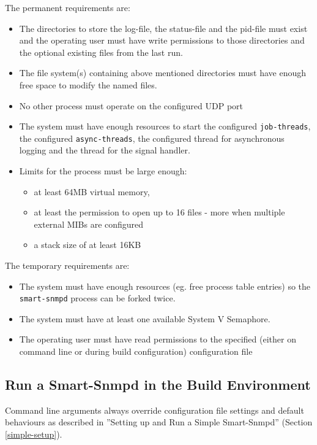 The permanent requirements are:
\begin{itemize}
\item The directories to store the log-file, the status-file and the pid-file
must exist and the operating user must have write permissions to those
directories and the optional existing files from the last run.
\item The file system(s) containing above mentioned directories must have
enough free space to modify the named files.
\item No other process must operate on the configured UDP port
\item The system must have enough resources to start the configured
\texttt{job-threads}, the configured \texttt{async-threads}, the configured
thread for asynchronous logging and the thread for the signal handler.
\item Limits for the process must be large enough:
\begin{itemize}
\item at least 64MB virtual memory,
\item at least the permission to open up to 16 files - more when multiple external MIBs are configured
\item a stack size of at least 16KB
\end{itemize}
\end{itemize}

The temporary requirements are:
\begin{itemize}
\item The system must have enough resources (eg. free process table entries)
so the \texttt{smart-snmpd} process can be forked twice.
\item The system must have at least one available System V Semaphore.
\item The operating user must have read permissions to the specified
(either on command line or during build configuration) configuration file
\end{itemize}

\subsection{Run a Smart-Snmpd in the Build Environment}

\label{setup-build}

Command line arguments always override configuration file settings and
default behaviours as described in ''Setting up and Run a Simple
Smart-Snmpd'' (Section \ref{simple-setup}).

